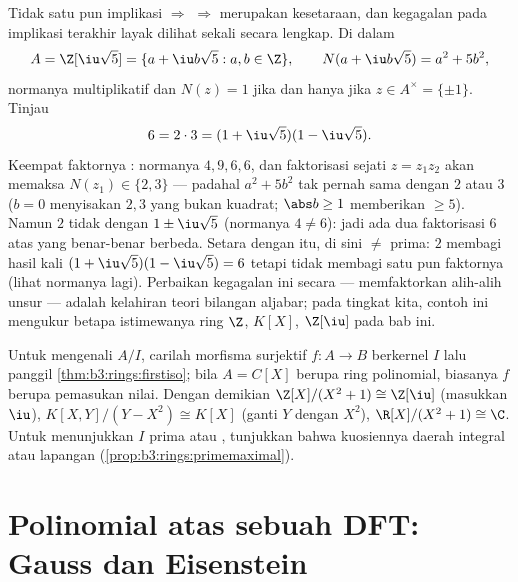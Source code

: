 \begin{example}
\label{ex:b3:rings:nonufd}
Tidak satu pun implikasi  $\Rightarrow$ 
$\Rightarrow$  merupakan kesetaraan, dan kegagalan pada
implikasi terakhir layak dilihat sekali secara lengkap. Di dalam
\[
A = \Z[\iu\sqrt5] = \{a + \iu b\sqrt5 : a, b \in \Z\},
\qquad N(a + \iu b\sqrt5) = a^2 + 5b^2,
\]
normanya multiplikatif dan $N(z) = 1$ jika dan hanya jika $z \in
A^\times = \{\pm1\}$. Tinjau
\[
6 = 2 \cdot 3 = (1 + \iu\sqrt5)(1 - \iu\sqrt5).
\]
Keempat faktornya : normanya $4, 9, 6,
6$, dan faktorisasi sejati $z = z_1z_2$ akan memaksa
$N(z_1) \in \{2, 3\}$ --- padahal $a^2 + 5b^2$ tak pernah sama dengan $2$
atau $3$ ($b = 0$ menyisakan $2, 3$ yang bukan kuadrat; $\abs b \geq
1$ memberikan $\geq 5$). Namun $2$ tidak  dengan $1 \pm
\iu\sqrt5$ (normanya $4 \neq 6$): jadi ada dua faktorisasi $6$ atas
 yang benar-benar berbeda. Setara dengan itu,
di sini  $\neq$ prima: $2$ membagi hasil kali $(1 +
\iu\sqrt5)(1 - \iu\sqrt5) = 6$ tetapi tidak membagi satu pun faktornya (lihat
normanya lagi). Perbaikan kegagalan ini secara  ---
memfaktorkan \emph{} alih-alih unsur --- adalah
kelahiran teori bilangan aljabar; pada tingkat kita, contoh ini
mengukur betapa istimewanya ring  $\Z$, $K[X]$,
$\Z[\iu]$ pada bab ini.
\end{example}

\begin{method}\label{met:b3:rings:quotient}
Untuk mengenali  $A/I$, carilah morfisma surjektif
$f \colon A \to B$ berkernel $I$ lalu panggil
\cref{thm:b3:rings:firstiso}; bila $A = C[X]$ berupa ring
polinomial, biasanya $f$ berupa pemasukan nilai. Dengan demikian $\Z[X]/(X^2+1) \cong
\Z[\iu]$ (masukkan $\iu$), $K[X,Y]/(Y - X^2) \cong K[X]$
(ganti $Y$ dengan $X^2$), $\R[X]/(X^2+1) \cong \C$. Untuk menunjukkan $I$
prima atau , tunjukkan bahwa kuosiennya daerah integral atau lapangan
(\cref{prop:b3:rings:primemaximal}).
\end{method}

\section{Polinomial atas sebuah DFT: Gauss dan Eisenstein}


